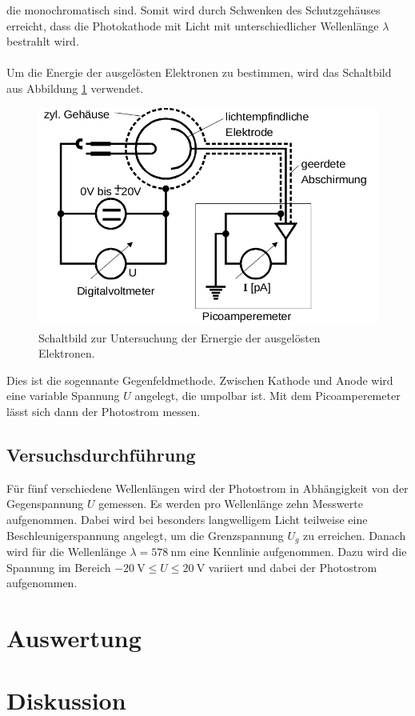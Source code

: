 die monochromatisch sind. Somit wird durch Schwenken des Schutzgehäuses erreicht, dass die Photokathode
mit Licht mit unterschiedlicher Wellenlänge $\lambda$ bestrahlt wird. \\
\\
Um die Energie der ausgelösten Elektronen zu bestimmen, wird das Schaltbild aus Abbildung \ref{fig:4}
verwendet.
\begin{figure}[h]
  \centering
  \includegraphics[scale=0.4]{schaltbild.png}
  \caption{Schaltbild zur Untersuchung der Ernergie der ausgelösten Elektronen.}
  \label{fig:4}
\end{figure}
Dies ist die sogennante Gegenfeldmethode. Zwischen Kathode und Anode wird eine variable
Spannung $U$ angelegt, die umpolbar ist. Mit dem Picoamperemeter lässt sich dann der
Photostrom messen.
\subsection{Versuchsdurchführung}
Für fünf verschiedene Wellenlängen wird der Photostrom in Abhängigkeit von der Gegenspannung
$U$ gemessen. Es werden pro Wellenlänge zehn Messwerte aufgenommen. Dabei wird bei besonders
langwelligem Licht teilweise eine Beschleunigerspannung angelegt, um die Grenzspannung
$U_g$ zu erreichen. Danach wird für die Wellenlänge
$\lambda = \SI{578}{\nano\meter}$ eine Kennlinie aufgenommen. Dazu wird die Spannung
im Bereich $\SI{-20}{\volt} \leq U \leq \SI{20}{\volt}$ variiert und dabei der Photostrom
aufgenommen.

\section{Auswertung}

\section{Diskussion}
\newpage
\nocite{*}
\printbibliography
